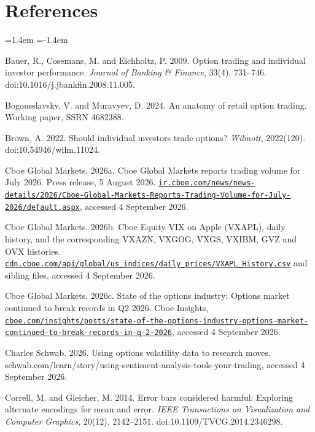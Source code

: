 \documentclass[11pt,a4paper]{article}
\begin{document}
\section*{References}
\sloppy
\begin{list}{}{\leftmargin=1.4em \itemindent=-1.4em \itemsep=4pt \topsep=6pt}
\item Bauer, R., Cosemans, M. and Eichholtz, P. 2009. Option trading and individual investor performance. \emph{Journal of Banking \& Finance}, 33(4), 731--746. doi:10.1016/j.jbankfin.2008.11.005.
\item Bogousslavsky, V. and Muravyev, D. 2024. An anatomy of retail option trading. Working paper, SSRN 4682388.
\item Brown, A. 2022. Should individual investors trade options? \emph{Wilmott}, 2022(120). doi:10.54946/wilm.11024.
\item Cboe Global Markets. 2026a. Cboe Global Markets reports trading volume for July 2026. Press release, 5 August 2026. \href{https://ir.cboe.com/news/news-details/2026/Cboe-Global-Markets-Reports-Trading-Volume-for-July-2026/default.aspx}{\nolinkurl{ir.cboe.com/news/news-details/2026/Cboe-Global-Markets-Reports-Trading-Volume-for-July-2026/default.aspx}}, accessed 4 September 2026.
\item Cboe Global Markets. 2026b. Cboe Equity VIX on Apple (VXAPL), daily history, and the corresponding VXAZN, VXGOG, VXGS, VXIBM, GVZ and OVX histories. \href{https://cdn.cboe.com/api/global/us_indices/daily_prices/VXAPL_History.csv}{\nolinkurl{cdn.cboe.com/api/global/us_indices/daily_prices/VXAPL_History.csv}} and sibling files, accessed 4 September 2026.
\item Cboe Global Markets. 2026c. State of the options industry: Options market continued to break records in Q2 2026. Cboe Insights, \href{https://cboe.com/insights/posts/state-of-the-options-industry-options-market-continued-to-break-records-in-q-2-2026}{\nolinkurl{cboe.com/insights/posts/state-of-the-options-industry-options-market-continued-to-break-records-in-q-2-2026}}, accessed 4 September 2026.
\item Charles Schwab. 2026. Using options volatility data to research moves. schwab.com/learn/story/using-sentiment-analysis-tools-your-trading, accessed 4 September 2026.
\item Correll, M. and Gleicher, M. 2014. Error bars considered harmful: Exploring alternate encodings for mean and error. \emph{IEEE Transactions on Visualization and Computer Graphics}, 20(12), 2142--2151. doi:10.1109/TVCG.2014.2346298.

\end{list}
\end{document}
